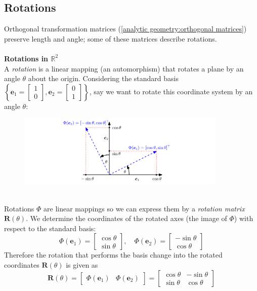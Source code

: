 \documentclass{report}
\begin{document}
\subsection{Rotations} %
Orthogonal transformation matrices (\ref{analytic geometry:orthogonal matrices}) preserve length and angle; 
some of these matrices describe rotations.\\
\vspace{1mm}\\
\textbf{Rotations in $\mathbb{R}^2$}\\
A \textit{rotation} is a linear mapping (an automorphism) that rotates a plane by an angle $\theta$ about the
origin. Considering the standard basis $\left\{\bm{e}_1=
\begin{bmatrix}1\\0\end{bmatrix},\bm{e}_2=\begin{bmatrix}
0\\1\end{bmatrix}\right\}$,
say we want to rotate this coordinate system by an angle 
$\theta$:
\begin{figure}[h]
\includegraphics[width=10cm]{12}\\
\centering
\end{figure}\\
Rotations $\Phi$ are linear mappings so we can express them by a \textit{rotation matrix} $\bm{R}(\theta)$. 
We determine the coordinates of the rotated axes (the image of $\Phi$) with respect to the standard
basis:
\begin{equation*}
\Phi(\bm{e}_1)=\begin{bmatrix}\cos\theta\\\sin\theta\end{bmatrix},\quad
\Phi(\bm{e}_2)=\begin{bmatrix}-\sin\theta\\\cos\theta\end{bmatrix}
\end{equation*}
Therefore the rotation that performs the basis change into the rotated coordinates $\bm{R}(\theta)$ is given as
\begin{equation*}
\bm{R}(\theta)=\begin{bmatrix}\Phi(\bm{e}_1)&\Phi(\bm{e}_2)\end{bmatrix}
=\begin{bmatrix}\cos\theta&-\sin\theta\\\sin\theta&\cos\theta\end{bmatrix}
\end{equation*}
\end{document}
